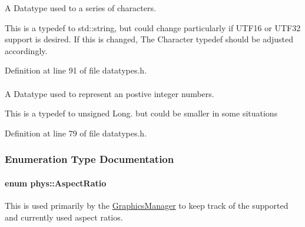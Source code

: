 A Datatype used to a series of characters. 

This is a typedef to std::string, but could change particularly if UTF16 or UTF32 support is desired. If this is changed, The Character typedef should be adjusted accordingly. 

Definition at line 91 of file datatypes.h.

\hypertarget{namespacephys_a460f6bc24c8dd347b05e0366ae34f34a}{
\paragraph[{Whole}]{}\hfill}
\label{namespacephys_a460f6bc24c8dd347b05e0366ae34f34a}


A Datatype used to represent an postive integer numbers. 

This is a typedef to unsigned Long. but could be smaller in some situations 

Definition at line 79 of file datatypes.h.



\subsubsection{Enumeration Type Documentation}
\hypertarget{namespacephys_aa48055a9624c26d73f77ca67499c7aed}{
\paragraph[{AspectRatio}]{\setlength{\rightskip}{0pt plus 5cm}enum {\bf phys::AspectRatio}}\hfill}
\label{namespacephys_aa48055a9624c26d73f77ca67499c7aed}


This is used primarily by the \hyperlink{classphys_1_1GraphicsManager}{GraphicsManager} to keep track of the supported and currently used aspect ratios. 

